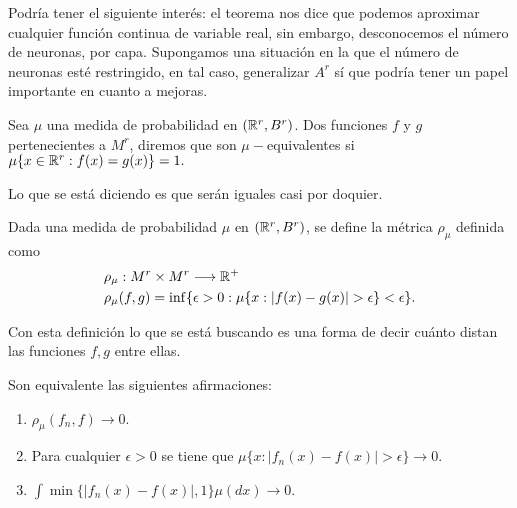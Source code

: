 Podría tener el siguiente interés:
el teorema nos dice que podemos aproximar cualquier función continua de variable real, sin embargo, desconocemos el 
número de neuronas, por capa. Supongamos una situación en la que el número de neuronas esté restringido, en tal caso,
generalizar $A^r$ sí que podría tener un papel importante en cuanto a mejoras. 


\begin{definicion}
    Sea $\mu$ una medida de probabilidad en $(\mathbb{R}^r, B^r)$.  Dos funciones 
    $f$ y $g$ pertenecientes a $M^r$, diremos que son $\mu -$equivalentes 
    si $\mu\{ x \in \mathbb{R}^r : f(x)=g(x) \} = 1.$
\end{definicion}

Lo que se está diciendo es que serán iguales casi por doquier.   

\begin{definicion} 
    Dada una medida de probabilidad $\mu$ en $(\mathbb{R}^r, B^r)$, se define 
    la métrica $\rho_{\mu}$ definida como 
    \begin{equation}
        \begin{split}
            & \rho_{\mu} : M^r \times M^r \longrightarrow \mathbb{R}^+ \\
            & \rho_{\mu}(f,g) = \inf \{ \epsilon > 0: \mu \{ x : |f(x) - g(x)| > \epsilon \} < \epsilon \}.
        \end{split}
    \end{equation}
\end{definicion}  

Con esta definición lo que se está buscando es una forma de decir cuánto 
distan las funciones $f,g$ entre ellas.  

\begin{lema}\label{lema:caracterizacionConvergenciaSucesiones2_1}
    Son equivalente las siguientes afirmaciones: 
    \begin{enumerate}[label=(\roman*)]
        \item $\rho_{\mu}(f_n, f) \longrightarrow 0$.
        \item Para cualquier  $\epsilon > 0$ se tiene que $\mu \{  x : |f_n(x) - f(x)| > \epsilon \} \longrightarrow 0$.
        \item $\int \min \{ |f_n(x) - f(x)|, 1\} \mu(dx) \longrightarrow 0.$
    \end{enumerate}
\end{lema}

